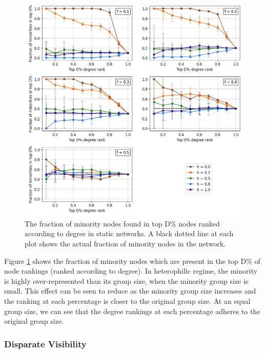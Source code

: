 \begin{figure}[h!]
	\centering
	\includegraphics[width=1.0\textwidth]{images/top_static.png}
	\caption{The fraction of minority nodes found in top D\% nodes ranked according to degree in static networks. A black dotted line at each plot shows the actual fraction of minority nodes in the network.}
	\label{top_static_fig}
\end{figure}

Figure \ref{top_static_fig} shows the fraction of minority nodes which are present in the top D\% of node rankings (ranked according to degree). In heterophilic regime, the minority is highly over-represented than its group size, when the minority group size is small. This effect can be seen to reduce as the minority group size increases and the ranking at each percentage is closer to the original group size. At an equal group size, we can see that the degree rankings at each percentage adheres to the original group size.

\subsubsection{Disparate Visibility}
\label{static_dv}


